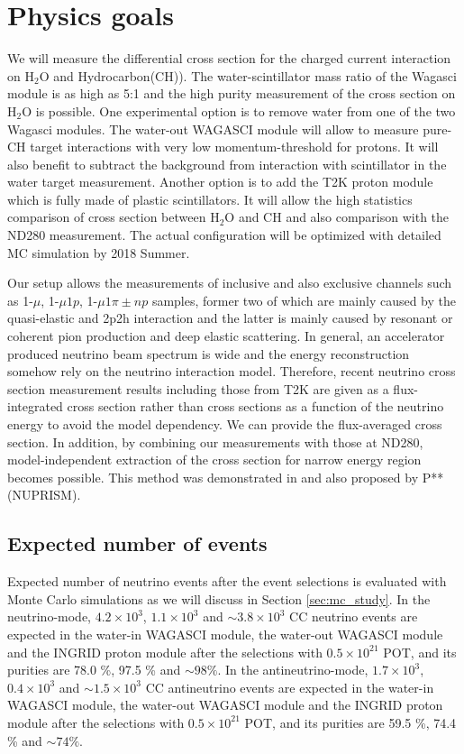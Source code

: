 \section{Physics goals}
We will measure the differential cross section for the charged current interaction on $\mathrm{H_2O}$ and Hydrocarbon(CH)).
The water-scintillator mass ratio of the Wagasci module is as high as 5:1 and the high purity measurement
of the cross section on $\mathrm{H_2O}$ is possible.
One experimental option is to remove water from one of the two Wagasci modules. 
The water-out WAGASCI module will allow to measure pure-CH target interactions with very low momentum-threshold for protons.
It will also benefit to subtract the background from interaction with scintillator in the water target measurement.
Another option is to add the T2K proton module which is fully made of plastic scintillators.
It will allow the high statistics comparison of cross section between $\mathrm{H_2O}$ and CH and also comparison
with the ND280 measurement. The actual configuration will be optimized with detailed MC simulation by 2018 Summer.

Our setup allows the measurements of inclusive and also exclusive channels such as
1-$\mu$, 1-$\mu 1p$, 1-$\mu 1\pi{\pm} np$ samples, former two of which are mainly caused by the quasi-elastic and
2p2h interaction and the latter is mainly caused by resonant or coherent pion production and deep elastic scattering.
In general, an accelerator produced neutrino beam spectrum is wide and the energy reconstruction
somehow rely on the neutrino interaction model.
Therefore, recent neutrino cross section measurement results including those from T2K are given
as a flux-integrated cross section rather than cross sections as a function of the neutrino energy to avoid the model dependency.
We can provide the flux-averaged cross section.
In addition, by combining our measurements with those at ND280, model-independent extraction of the cross section
for narrow energy region becomes possible.
This method was demonstrated in \cite{Abe:2015biq} and also proposed by P** (NUPRISM).

\subsection{Expected number of events}
Expected number of neutrino events after the event selections is evaluated with Monte Carlo simulations as we will discuss in Section \ref{sec:mc_study}.
In the neutrino-mode, $4.2 \times 10^{3}$, $1.1 \times 10^{3}$ and $\sim 3.8 \times 10^{3}$ CC neutrino events are expected in the water-in WAGASCI module, the water-out WAGASCI module and the INGRID proton module after the selections with $0.5\times 10^{21}$ POT, and its purities are 78.0 \%, 97.5 \% and $\sim 98 \%$.
In the antineutrino-mode, $1.7 \times 10^{3}$, $0.4 \times 10^{3}$ and $\sim 1.5 \times 10^{3}$ CC antineutrino events are expected in the water-in WAGASCI module, the water-out WAGASCI module and the INGRID proton module after the selections with $0.5\times 10^{21}$ POT, and its purities are 59.5 \%, 74.4 \% and $\sim 74 \%$.


